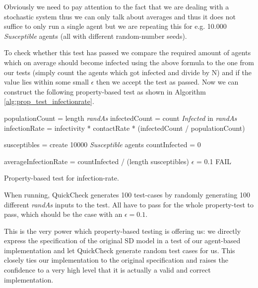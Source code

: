 Obviously we need to pay attention to the fact that we are dealing with a stochastic system thus we can only talk about averages and thus it does not suffice to only run a single agent but we are repeating this for e.g. 10.000 \textit{Susceptible} agents (all with different random-number seeds). 

To check whether this test has passed we compare the required amount of agents which on average should become infected using the above formula to the one from our tests (simply count the agents which got infected and divide by N) and if the value lies within some small $\epsilon$ then we accept the test as passed. Now we can construct the following property-based test as shown in Algorithm \ref{alg:prop_test_infectionrate}.

\begin{algorithm}
populationCount     = length \textit{randAs}\;
infectedCount       = count \textit{Infected} in \textit{randAs}\;
infectionRate       = infectivity * contactRate * (infectedCount / populationCount)\;

susceptibles = create 10000 \textit{Susceptible} agents\;
countInfected = 0\;

averageInfectionRate = countInfected / (length susceptibles)\;
$\epsilon$ = 0.1\;
 {
  FAIL\;
}
\caption{Property-based test for infection-rate.}
\end{algorithm}
\label{alg:prop_test_infectionrate}

When running, QuickCheck generates 100 test-cases by randomly generating 100 different \textit{randAs} inputs to the test. All have to pass for the whole property-test to pass, which should be the case with an $\epsilon = 0.1$. 

This is the very power which property-based testing is offering us: we directly express the specification of the original SD model in a test of our agent-based implementation and let QuickCheck generate random test cases for us. This closely ties our implementation to the original specification and raises the confidence to a very high level that it is actually a valid and correct implementation.

